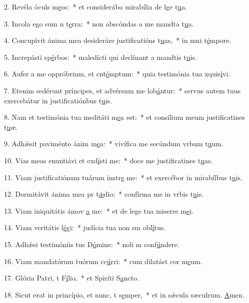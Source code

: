 2. Revéla óculs m\uline{e}os:~* et considerábo mirabília de lge t\uline{u}a.\par 
3. Incola ego sum n t\uline{e}rra:~* non abscóndas a me mandta t\uline{u}a.\par 
4. Concupívit ánima mea desideráre justificatións t\uline{u}as,~* in mni t\uline{é}mpore.\par 
5. Increpásti sp\uline{é}rbos:~* maledícti qui declínant a mandtis t\uline{u}is.\par 
6. Aufer a me oppróbrium, et cnt\uline{é}mptum:~* quia testimónia tua xquis\uline{í}vi.\par 
7. Etenim sedérunt príncipes, et advérsum me lob\uline{á}ntur:~* servus autem tuus exercebátur in justificatiónbus t\uline{u}is.\par 
8. Nam et testimónia tua meditáti m\uline{e}a est:~* et consílium meum justificatines t\uline{u}æ.\par 
9. Adhǽsit paviménto ánim m\uline{e}a:~* vivífica me secúndum vrbum t\uline{u}um.\par 
10. Vias meas enuntiávi et exd\uline{í}sti me:~* doce me justificatines t\uline{u}as.\par 
11. Viam justificatiónum tuárum ínstr\uline{e} me:~* et exercébor in mirabílbus t\uline{u}is.\par 
12. Dormitávit ánima mea pr t\uline{ǽ}dio:~* confírma me in vrbis t\uline{u}is.\par 
13. Viam iniquitátis ámov \uline{a} me:~* et de lege tua miserre m\uline{e}i.\par 
14. Viam veritátis l\uline{é}gi:~* judícia tua non sm obl\uline{í}tus.\par 
15. Adhǽsi testimóniis tus D\uline{ó}mine:~* noli m conf\uline{ú}ndere.\par 
16. Viam mandatórum tuórum cc\uline{ú}rri:~* cum dilatást cor m\uline{e}um.\par 
17. Glória Patri, t F\uline{í}lio,~* et Spiríti S\uline{a}ncto.\par 
18. Sicut erat in princípio, et nunc, t s\uline{e}mper,~* et in sǽcula sæculrum. \uline{A}men.\par 
